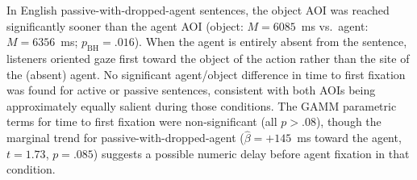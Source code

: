 \documentclass[12pt, a4paper]{article}
\begin{document}
In English passive-with-dropped-agent sentences, the object AOI was reached
significantly sooner than the agent AOI (object: $M = 6085$~ms vs.\ agent:
$M = 6356$~ms; $p_{\text{BH}} = .016$).
When the agent is entirely absent from the sentence, listeners oriented gaze
first toward the object of the action rather than the site of the (absent)
agent.
No significant agent/object difference in time to first fixation was found
for active or passive sentences, consistent with both AOIs being approximately
equally salient during those conditions.
The GAMM parametric terms for time to first fixation were non-significant
(all $p > .08$), though the marginal trend for passive-with-dropped-agent
($\hat{\beta} = +145$~ms toward the agent, $t = 1.73$, $p = .085$) suggests
a possible numeric delay before agent fixation in that condition.
\end{document}
